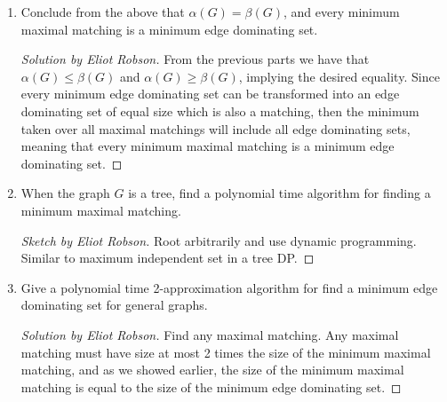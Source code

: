 \documentclass{article}
\newenvironment{sketch}[1]{\begin{proof}[Sketch by #1]}{\end{proof}}
\newenvironment{solution}[1]{\begin{proof}[Solution by #1]}{\end{proof}}
\begin{document}
\begin{enumerate}
    \begin{solution}{Eliot Robson}
        If \(F\) is not a matching, this means there are edges \(e,f \in F\) such that \(e \cap f \neq \emptyset\). Then, all edges incident to the endpoint \(v \in f \setminus e\) are dominated by only \(f\) and not \(e\). If all edges incident to \(v\) are dominated by some edge other than \(f\), we may simply remove \(f\) from \(F\) and would still have an edge dominating set, contradicting the minimality of \(F\). Thus, there must be some edge incident to \(v\) only dominated by \(f\). Call this edge \(f'\) and consider that the set \(F' = F - f + f'\) is still dominating (as all edges incident to \(v\) are now dominated by \(f'\)) but has two less edges which share an endpoint than \(F\) (since by assumption, the only element of \(F\) that \(f'\) shared an endpoint with was \(f\)). Thus, we can repeat this procedure until \(F'\) no longer has any edges which share an endpoint. This runs in polynomial time as we can only run this for \(O(m)\) iterations and each iteration takes polynomial time.
    \end{solution}
	
	\item Conclude from the above that \(\alpha(G) = \beta(G)\), and every minimum maximal matching is a minimum edge dominating set.
    
    \begin{solution}{Eliot Robson}
        From the previous parts we have that \(\alpha(G) \leq \beta(G)\) and \(\alpha(G) \geq \beta(G)\), implying the desired equality. Since every minimum edge dominating set can be transformed into an edge dominating set of equal size which is also a matching, then the minimum taken over all maximal matchings will include all edge dominating sets, meaning that every minimum maximal matching is a minimum edge dominating set.
    \end{solution}
	
	\item When the graph \(G\) is a tree, find a polynomial time algorithm for finding a minimum maximal matching.
    
    \begin{sketch}{Eliot Robson}
        Root arbitrarily and use dynamic programming. Similar to maximum independent set in a tree DP.
    \end{sketch}
	
	\item Give a polynomial time 2-approximation algorithm for find a minimum edge dominating set for general graphs.
    
    \begin{solution}{Eliot Robson}
        Find any maximal matching. Any maximal matching must have size at most 2 times the size of the minimum maximal matching, and as we showed earlier, the size of the minimum maximal matching is equal to the size of the minimum edge dominating set.
    \end{solution}
\end{enumerate}
\end{document}
